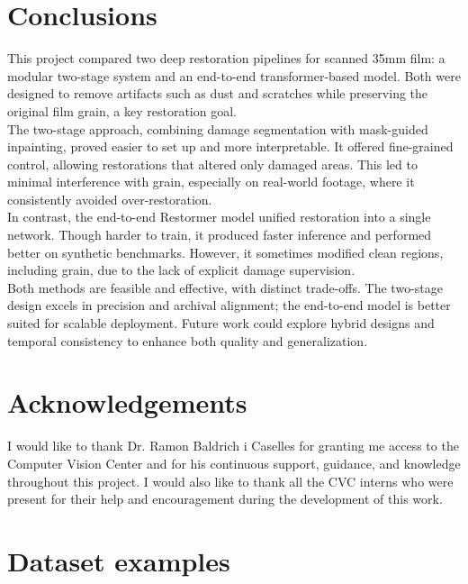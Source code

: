 \documentclass[10pt,a4paper,twocolumn,twoside]{article}
\begin{document}
\section{Conclusions}
This project compared two deep restoration pipelines for scanned 35mm film: a modular two-stage system and an end-to-end transformer-based model. Both were designed to remove artifacts such as dust and scratches while preserving the original film grain, a key restoration goal. \\
The two-stage approach, combining damage segmentation with mask-guided inpainting, proved easier to set up and more interpretable. It offered fine-grained control, allowing restorations that altered only damaged areas. This led to minimal interference with grain, especially on real-world footage, where it consistently avoided over-restoration. \\
In contrast, the end-to-end Restormer model unified restoration into a single network. Though harder to train, it produced faster inference and performed better on synthetic benchmarks. However, it sometimes modified clean regions, including grain, due to the lack of explicit damage supervision. \\
Both methods are feasible and effective, with distinct trade-offs. The two-stage design excels in precision and archival alignment; the end-to-end model is better suited for scalable deployment. Future work could explore hybrid designs and temporal consistency to enhance both quality and generalization.

\section{Acknowledgements}
I would like to thank Dr. Ramon Baldrich i Caselles for granting me access to the Computer Vision Center and for his continuous support, guidance, and knowledge throughout this project. I would also like to thank all the CVC interns who were present for their help and encouragement during the development of this work.
\begingroup
\small  %
\renewcommand{\refname}{References}


\endgroup
\onecolumn
\appendix
\section{Dataset examples}
\end{document}
